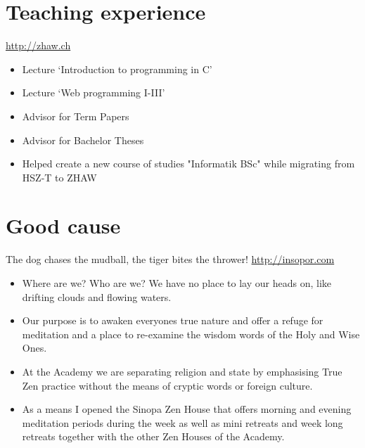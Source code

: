 \documentclass[10pt,a4paper]{moderncv}
\begin{document}
\section{Teaching experience}
{\url{http://zhaw.ch}
\newline
\begin{itemize}
\item Lecture `Introduction to programming in C'
\item Lecture `Web programming I-III'
\item Advisor for Term Papers
\item Advisor for Bachelor Theses
\item Helped create a new course of studies "Informatik BSc" while migrating from HSZ-T to ZHAW
\end{itemize}}


\section{Good cause}
{The dog chases the mudball, the tiger bites the thrower!
\newline
\url{http://insopor.com}
\newline
\begin{itemize}
  \item Where are we? Who are we? We have no place to lay our heads on, like
    drifting clouds and flowing waters.
  \item Our purpose is to awaken everyones true nature and offer a refuge for
    meditation and a place to re-examine the wisdom words of the Holy and Wise
    Ones.
  \item At the Academy we are separating religion and state by emphasising True
    Zen practice without the means of cryptic words or foreign culture.
  \item As a means I opened the Sinopa Zen House that offers morning and
  evening meditation periods during the week as well as mini retreats and week
  long retreats together with the other Zen Houses of the Academy.
\end{itemize}}
\end{document}
